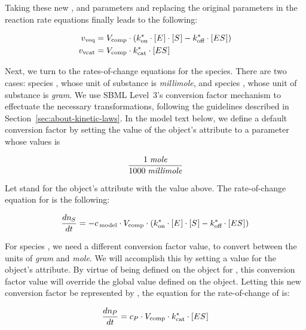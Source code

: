 \newcommand{\nS}{\ensuremath{n_{\mkern-1muS}}\xspace}
\newcommand{\nP}{\ensuremath{n_{\mkern-1muP}}\xspace}

Taking these new \konnew, \koffnew and \kcatnew parameters and
replacing the original parameters in the reaction rate equations
finally leads to the following:
\begin{linenomath}
  \begin{align*}
    v_\text{veq}  & = V_\text{comp} \cdot (k_\text{on}^{*} \cdot [E\mkern1mu] \cdot [S\mkern1mu] - k_\text{off}^{*} \cdot [ES\mkern1mu])\\
    v_\text{vcat} & = V_\text{comp} \cdot k_\text{cat}^{*} \cdot [ES\mkern1mu]
  \end{align*}
\end{linenomath}
Next, we turn to the rates-of-change equations for the species.
There are two cases: species , whose unit of substance
is \emph{millimole}, and species , whose unit of
substance is \emph{gram}.  We use SBML Level~3's conversion factor
mechanism to effectuate the necessary transformations, following
the guidelines described in Section~\ref{sec:about-kinetic-laws}.
In the model text below, we define a default conversion factor by
setting the value of the \Model object's 
attribute to a parameter whose values is
\begin{linenomath}
  \begin{equation*}
    \dfrac{1 \; \emph{mole}}{1000 \; \emph{millimole}}
  \end{equation*}
\end{linenomath}
Let \csg stand for the \Model object's 
attribute with the value above.  The rate-of-change equation for
 is the following:
\begin{linenomath}
  \begin{equation*}
    \dfrac{d \nS}{d t} = - \csg \cdot \Vcomp \cdot
    (\konnew \cdot \concent{E} \cdot \concent{S} - \koffnew \cdot \concent{ES})
  \end{equation*}
\end{linenomath}
For species , we need a different conversion factor
value, to convert between the units of \emph{gram} and
\emph{mole}.  We will accomplish this by setting a value for the
\Species object's  attribute.  By virtue
of being defined on the \Species object for , this
conversion factor value will override the global value defined on
the \Model object.  Letting this new conversion factor be
represented by \convP, the equation for the rate-of-change of
 is:
\begin{linenomath}
  \begin{equation*}
    \dfrac{d \nP}{d t} = \convP \cdot \Vcomp \cdot \kcatnew \cdot \concent{ES}
  \end{equation*}
\end{linenomath}

